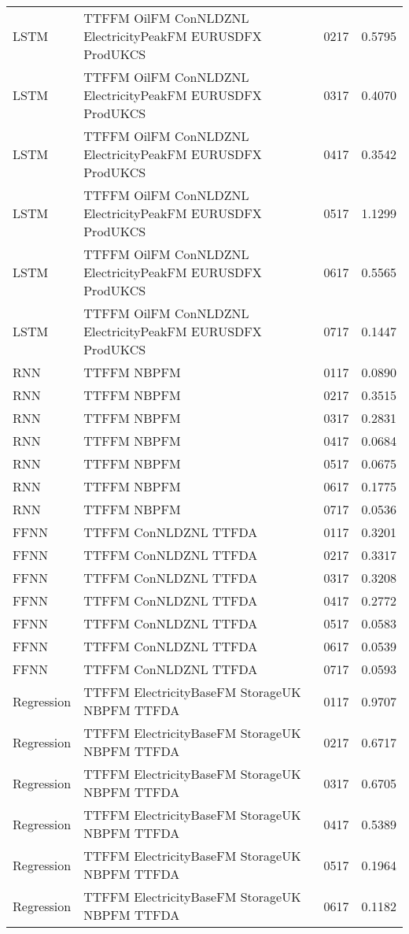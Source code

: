 \begin{table}[h!]
\begin{adjustbox}{max width=\textwidth}
\begin{tabular}{lllr}
  LSTM & TTFFM OilFM ConNLDZNL ElectricityPeakFM EURUSDFX ProdUKCS & 0217 & 0.5795 \\ 
  LSTM & TTFFM OilFM ConNLDZNL ElectricityPeakFM EURUSDFX ProdUKCS & 0317 & 0.4070 \\ 
  LSTM & TTFFM OilFM ConNLDZNL ElectricityPeakFM EURUSDFX ProdUKCS & 0417 & 0.3542 \\ 
  LSTM & TTFFM OilFM ConNLDZNL ElectricityPeakFM EURUSDFX ProdUKCS & 0517 & 1.1299 \\ 
  LSTM & TTFFM OilFM ConNLDZNL ElectricityPeakFM EURUSDFX ProdUKCS & 0617 & 0.5565 \\ 
  LSTM & TTFFM OilFM ConNLDZNL ElectricityPeakFM EURUSDFX ProdUKCS & 0717 & 0.1447 \\ 
  RNN & TTFFM NBPFM & 0117 & 0.0890 \\ 
  RNN & TTFFM NBPFM & 0217 & 0.3515 \\ 
  RNN & TTFFM NBPFM & 0317 & 0.2831 \\ 
  RNN & TTFFM NBPFM & 0417 & 0.0684 \\ 
  RNN & TTFFM NBPFM & 0517 & 0.0675 \\ 
  RNN & TTFFM NBPFM & 0617 & 0.1775 \\ 
  RNN & TTFFM NBPFM & 0717 & 0.0536 \\ 
  FFNN & TTFFM ConNLDZNL TTFDA & 0117 & 0.3201 \\ 
  FFNN & TTFFM ConNLDZNL TTFDA & 0217 & 0.3317 \\ 
  FFNN & TTFFM ConNLDZNL TTFDA & 0317 & 0.3208 \\ 
  FFNN & TTFFM ConNLDZNL TTFDA & 0417 & 0.2772 \\ 
  FFNN & TTFFM ConNLDZNL TTFDA & 0517 & 0.0583 \\ 
  FFNN & TTFFM ConNLDZNL TTFDA & 0617 & 0.0539 \\ 
  FFNN & TTFFM ConNLDZNL TTFDA & 0717 & 0.0593 \\ 
  Regression & TTFFM ElectricityBaseFM StorageUK NBPFM TTFDA & 0117 & 0.9707 \\ 
  Regression & TTFFM ElectricityBaseFM StorageUK NBPFM TTFDA & 0217 & 0.6717 \\ 
  Regression & TTFFM ElectricityBaseFM StorageUK NBPFM TTFDA & 0317 & 0.6705 \\ 
  Regression & TTFFM ElectricityBaseFM StorageUK NBPFM TTFDA & 0417 & 0.5389 \\ 
  Regression & TTFFM ElectricityBaseFM StorageUK NBPFM TTFDA & 0517 & 0.1964 \\ 
  Regression & TTFFM ElectricityBaseFM StorageUK NBPFM TTFDA & 0617 & 0.1182 \\ 

\end{tabular}
\end{adjustbox}
\end{table}
